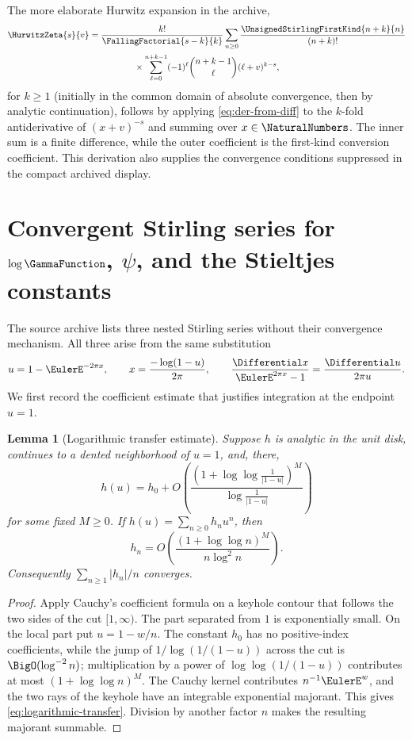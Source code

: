 \documentclass[11pt,a4paper,oneside,openany]{book}
\newtheorem{lemma}[theorem]{Lemma}
\theoremstyle{definition}
\theoremstyle{remark}
\begin{document}
The more elaborate Hurwitz expansion in the archive,
\begin{multline}\label{eq:hurwitz-finite-difference-expansion}
 \HurwitzZeta{s}{v}=\frac{k!}{\FallingFactorial{s-k}{k}}
 \sum_{n\ge0}\frac{\UnsignedStirlingFirstKind{n+k}{n}}{(n+k)!}\\
 {}\times\sum_{\ell=0}^{n+k-1}(-1)^\ell\binom{n+k-1}{\ell}
 (\ell+v)^{k-s},
\end{multline}
for $k\ge1$ (initially in the common domain of absolute convergence, then by
analytic continuation), follows by applying \cref{eq:der-from-diff} to the
$k$-fold antiderivative of $(x+v)^{-s}$ and summing over $x\in\NaturalNumbers$.  The inner sum is
a finite difference, while the outer coefficient is the first-kind conversion
coefficient.  This derivation also supplies the convergence conditions suppressed in
the compact archived display.


\section{Convergent Stirling series for \texorpdfstring{$\log\GammaFunction$}{log Gamma}, \texorpdfstring{$\psi$}{psi}, and the Stieltjes constants}
The source archive lists three nested Stirling series without their convergence
mechanism.  All three arise from the same substitution
\begin{equation}
\label{eq:logarithmic-binet-substitution}
 u=1-\EulerE^{-2\pi x},
 \qquad
 x=\frac{-\log(1-u)}{2\pi},
 \qquad
 \frac{\Differential x}{\EulerE^{2\pi x}-1}=\frac{\Differential u}{2\pi u}.
\end{equation}
We first record the coefficient estimate that justifies integration at the endpoint
$u=1$.

\begin{lemma}[Logarithmic transfer estimate]
\label{lem:logarithmic-transfer}
Suppose $h$ is analytic in the unit disk, continues to a dented neighborhood of
$u=1$, and, there,
\[
 h(u)=h_0+O\!\left(
 \frac{(1+\log\log\frac1{|1-u|})^M}
      {\log\frac1{|1-u|}}
 \right)
\]
for some fixed $M\ge0$.  If $h(u)=\sum_{n\ge0}h_nu^n$, then
\begin{equation}
\label{eq:logarithmic-transfer}
 h_n=O\!\left(
 \frac{(1+\log\log n)^M}{n\log^2 n}
 \right).
\end{equation}
Consequently $\sum_{n\ge1}|h_n|/n$ converges.
\end{lemma}
\begin{proof}
Apply Cauchy's coefficient formula on a keyhole contour that follows the two sides
of the cut $[1,\infty)$.  The part separated from $1$ is exponentially small.
On the local part put $u=1-w/n$.  The constant $h_0$ has no positive-index
coefficients, while the jump of
$1/\log(1/(1-u))$ across the cut is
$\BigO(\log^{-2}n)$; multiplication by a power of $\log\log(1/(1-u))$ contributes at
most $(1+\log\log n)^M$.  The Cauchy kernel contributes $n^{-1}\EulerE^w$, and the two
rays of the keyhole have an integrable exponential majorant.  This gives
\eqref{eq:logarithmic-transfer}.  Division by another factor $n$ makes the
resulting majorant summable.
\end{proof}
\end{document}
